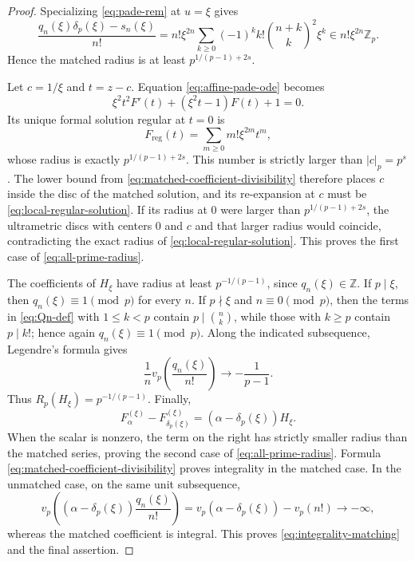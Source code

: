\documentclass[11pt]{article}
\theoremstyle{definition}
\theoremstyle{remark}
\begin{document}
\begin{proof}
Specializing \eqref{eq:pade-rem} at $u=\xi$ gives
\begin{equation}
 \frac{q_n(\xi)\delta_p(\xi)-s_n(\xi)}{n!}
 =n!\xi^{2n}\sum_{k\geq0}(-1)^k k!
          \binom{n+k}{k}^2\xi^k
 \in n!\xi^{2n}\mathbb Z_p.
\label{eq:matched-coefficient-divisibility}
\end{equation}
Hence the matched radius is at least
$p^{1/(p-1)+2s}$.

Let $c=1/\xi$ and $t=z-c$.  Equation
\eqref{eq:affine-pade-ode} becomes
\begin{equation}
 \xi^2t^2F'(t)+(\xi^2t-1)F(t)+1=0.
\label{eq:local-affine-ode}
\end{equation}
Its unique formal solution regular at $t=0$ is
\begin{equation}
 F_{\mathrm{reg}}(t)=\sum_{m\geq0}m!\xi^{2m}t^m,
\label{eq:local-regular-solution}
\end{equation}
whose radius is exactly $p^{1/(p-1)+2s}$.  This number is strictly larger
than $|c|_p=p^s$.  The lower bound from
\eqref{eq:matched-coefficient-divisibility} therefore places $c$ inside the
disc of the matched solution, and its re-expansion at $c$ must be
\eqref{eq:local-regular-solution}.  If its radius at $0$ were larger than
$p^{1/(p-1)+2s}$, the ultrametric discs with centers $0$ and $c$ and that
larger radius would coincide, contradicting the exact radius of
\eqref{eq:local-regular-solution}.  This proves the first case of
\eqref{eq:all-prime-radius}.

The coefficients of $H_\xi$ have radius at least $p^{-1/(p-1)}$, since
$q_n(\xi)\in\mathbb Z$.  If $p\mid\xi$, then
$q_n(\xi)\equiv1\pmod p$ for every $n$.  If $p\nmid\xi$ and
$n\equiv0\pmod p$, then the terms in \eqref{eq:Qn-def} with
$1\leq k<p$ contain $p\mid\binom nk$, while those with $k\geq p$ contain
$p\mid k!$; hence again $q_n(\xi)\equiv1\pmod p$.  Along the indicated
subsequence, Legendre's formula gives
\[
 \frac1n v_p\!\left(\frac{q_n(\xi)}{n!}\right)
 \longrightarrow-\frac1{p-1}.
\]
Thus $R_p(H_\xi)=p^{-1/(p-1)}$.  Finally,
\[
 F_\alpha^{(\xi)}-F_{\delta_p(\xi)}^{(\xi)}
   =(\alpha-\delta_p(\xi))H_\xi.
\]
When the scalar is nonzero, the term on the right has strictly smaller
radius than the matched series, proving the second case of
\eqref{eq:all-prime-radius}.  Formula
\eqref{eq:matched-coefficient-divisibility} proves integrality in the
matched case.  In the unmatched case, on the same unit subsequence,
\[
 v_p\!\left((\alpha-\delta_p(\xi))\frac{q_n(\xi)}{n!}\right)
 =v_p(\alpha-\delta_p(\xi))-v_p(n!)\longrightarrow-\infty,
\]
whereas the matched coefficient is integral.  This proves
\eqref{eq:integrality-matching} and the final assertion.
\end{proof}
\end{document}
